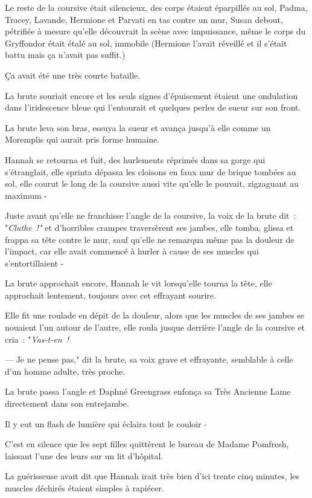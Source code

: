 Le reste de la coursive était silencieux, des corps étaient éparpillés au sol, Padma, Tracey, Lavande, Hermione et Parvati en tas contre un mur, Susan debout, pétrifiée à mesure qu'elle découvrait la scène avec impuissance, même le corps du Gryffondor était étalé au sol, immobile (Hermione l'avait réveillé et il s'était battu mais ça n'avait pas suffit.)

Ça avait été une très courte bataille.

La brute souriait encore et les seuls signes d'épuisement étaient une ondulation dans l'iridescence bleue qui l'entourait et quelques perles de sueur sur son front.

La brute leva son bras, essuya la sueur et avança jusqu'à elle comme un Moremplis qui aurait pris forme humaine.

Hannah se retourna et fuit, des hurlements réprimés dans sa gorge qui s'étranglait, elle sprinta dépassa les cloisons en faux mur de brique tombées au sol, elle courut le long de la coursive aussi vite qu'elle le pouvait, zigzaguant au maximum -

Juste avant qu'elle ne franchisse l'angle de la coursive, la voix de la brute dit~: "\emph{Cluthe~!"} et d'horribles crampes traversèrent ses jambes, elle tomba, glissa et frappa sa tête contre le mur, sauf qu'elle ne remarqua même pas la douleur de l'impact, car elle avait commencé à hurler à cause de ses muscles qui s'entortillaient -

La brute approchait encore, Hannah le vit lorsqu'elle tourna la tête, elle approchait lentement, toujours avec cet effrayant sourire.

Elle fit une roulade en dépit de la douleur, alors que les muscles de ses jambes se nouaient l'un autour de l'autre, elle roula jusque derrière l'angle de la coursive et cria~: "\emph{Vas-t-en~!}

--- Je ne pense pas," dit la brute, sa voix grave et effrayante, semblable à celle d'un homme adulte, très proche.

La brute passa l'angle et Daphné Greengrass enfonça sa Très Ancienne Lame directement dans son entrejambe.

Il y eut un flash de lumière qui éclaira tout le couloir -

\later

C'est en silence que les sept filles quittèrent le bureau de Madame Pomfresh, laissant l'une des leurs sur un lit d'hôpital.

La guérisseuse avait dit que Hannah irait très bien d'ici trente cinq minutes, les muscles déchirés étaient simples à rapiécer.

